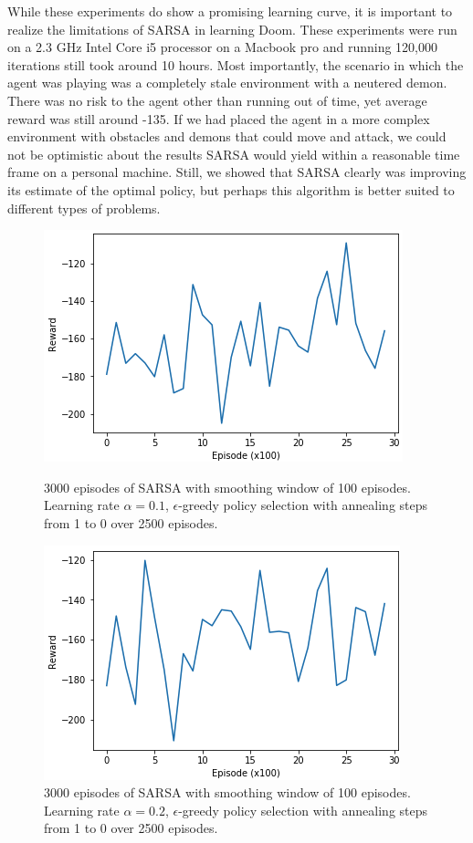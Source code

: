 \documentclass[letterpaper]{article} %
\begin{document}
While these experiments do show a promising learning curve, it is important to realize the limitations of SARSA in learning Doom. These experiments were run on a 2.3 GHz Intel Core i5 processor on a Macbook pro and running 120,000 iterations still took around 10 hours. Most importantly, the scenario in which the agent was playing was a completely stale environment with a neutered demon. There was no risk to the agent other than running out of time, yet average reward was still around -135. If we had placed the agent in a more complex environment with obstacles and demons that could move and attack, we could not be optimistic about the results SARSA would yield within a reasonable time frame on a personal machine. Still, we showed that SARSA clearly was improving its estimate of the optimal policy, but perhaps this algorithm is better suited to different types of problems.


\begin{figure}[h]
  \includegraphics[width = \columnwidth]{sarsa_3k_alpha1}
  \caption{3000 episodes of SARSA with smoothing window of 100 episodes. Learning rate $\alpha = 0.1$, $\epsilon$-greedy policy selection with annealing steps from 1 to 0 over 2500 episodes.}
\label{alpha1}

  \includegraphics[width = \columnwidth]{sarsa_3k_alpha2}
  \caption{3000 episodes of SARSA with smoothing window of 100 episodes. Learning rate $\alpha = 0.2$, $\epsilon$-greedy policy selection with annealing steps from 1 to 0 over 2500 episodes.}
\label{alpha2}
\end{figure}
\end{document}
